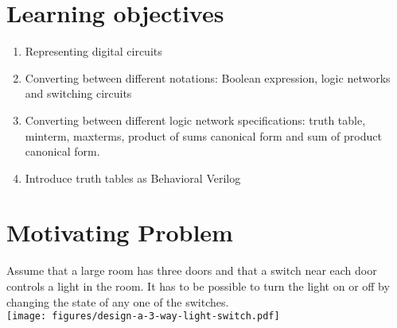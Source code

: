 \maketitle
\section{Learning objectives}
\begin{enumerate}
\item Representing digital circuits
\item Converting between different notations: Boolean expression, logic
  networks and switching circuits
\item Converting between different logic network specifications: truth table, minterm,
  maxterms, product of sums canonical form and sum of product canonical form.
\item Introduce truth tables as Behavioral Verilog
\end{enumerate}

\section{Motivating Problem}

\begin{example}
  Assume that a large room has three doors and that a switch near each door controls a light in the room. It has to be possible to turn the light on or off by changing the state of any one
  of the switches.\\
  \texttt{[image: figures/design-a-3-way-light-switch.pdf]}
\end{example}

\newpage

